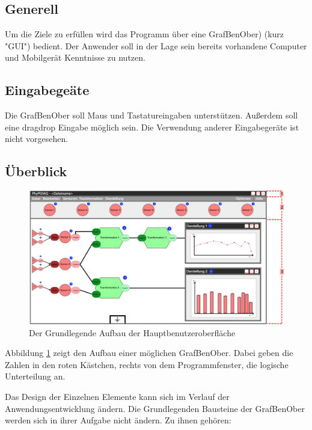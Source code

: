 \documentclass[parskip=full]{scrartcl}
\begin{document}
\subsection{Generell}

Um die Ziele zu erfüllen wird das Programm über eine \gls{GrafBenOber}) (kurz "GUI") bedient. Der Anwender soll in der Lage sein bereits vorhandene Computer und Mobilgerät Kenntnisse zu nutzen.

\subsection{Eingabegeäte}

Die \gls{GrafBenOber} soll Maus und Tastatureingaben unterstützen. Außerdem soll eine \gls{dragdrop} Eingabe möglich sein.
Die Verwendung anderer Eingabegeräte ist nicht vorgesehen.

\subsection{Überblick}

\begin{figure}[h]
	\begin{center}
		\includegraphics[width = 15cm]{Grafik/GUI-mit-Segmenten.png}
		\caption{Der Grundlegende Aufbau der Hauptbenutzeroberfläche}
		\label{GUI_Grundlage}
	\end{center}
\end{figure}

Abbildung \ref{GUI_Grundlage} zeigt den Aufbau einer möglichen \gls{GrafBenOber}. Dabei geben die Zahlen in den roten Kästchen, rechts von dem Programmfenster, die logische Unterteilung an.

Das Design der Einzelnen Elemente kann sich im Verlauf der Anwendungsentwicklung ändern. Die Grundlegenden Bausteine der \gls{GrafBenOber} werden sich in ihrer Aufgabe nicht ändern. Zu ihnen gehören:
\end{document}
